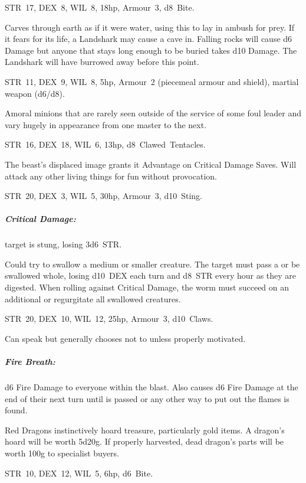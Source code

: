 \documentclass[itdr]{subfiles}
\begin{document}
STR~17, DEX~8, WIL~8, 18hp, Armour~3, d8~Bite.

Carves through earth as if it were water, using this to lay in ambush for prey. If it fears for its life, a Landshark may cause a cave in. Falling rocks will cause d6 Damage but anyone that stays long enough to be buried takes d10 Damage. The Landshark will have burrowed away before this point.

\vfill
\break

STR~11, DEX~9, WIL~8, 5hp, Armour~2 (piecemeal armour and shield), martial weapon (d6/d8).

Amoral minions that are rarely seen outside of the service of some foul leader and vary hugely in appearance from one master to the next.


STR~16, DEX~18, WIL~6, 13hp, d8~Clawed~Tentacles.

The beast's displaced image grants it Advantage on Critical Damage Saves. Will attack any other living things for fun without provocation.


STR~20, DEX~3, WIL~5, 30hp, Armour~3, d10~Sting.

\subparagraph{Critical Damage:} target is stung, losing 3d6~STR.

Could try to swallow a medium or smaller creature. The target must pass a  or be swallowed whole, losing d10~DEX each turn and d8~STR every hour as they are digested. When rolling against Critical Damage, the worm must succeed on an additional  or regurgitate all swallowed creatures.


\break


STR~20, DEX~10, WIL~12, 25hp, Armour~3, d10~Claws.

Can speak but generally chooses not to unless properly motivated.

\subparagraph{Fire Breath:} d6 Fire Damage to everyone within the blast. Also causes d6 Fire Damage at the end of their next turn until  is passed or any other way to put out the flames is found.

Red Dragons instinctively hoard treasure, particularly gold items. A dragon's hoard will be worth 5d20g. If properly harvested, dead dragon's parts will be worth 100g to specialist buyers.


STR~10, DEX~12, WIL~5, 6hp, d6~Bite.
\end{document}
